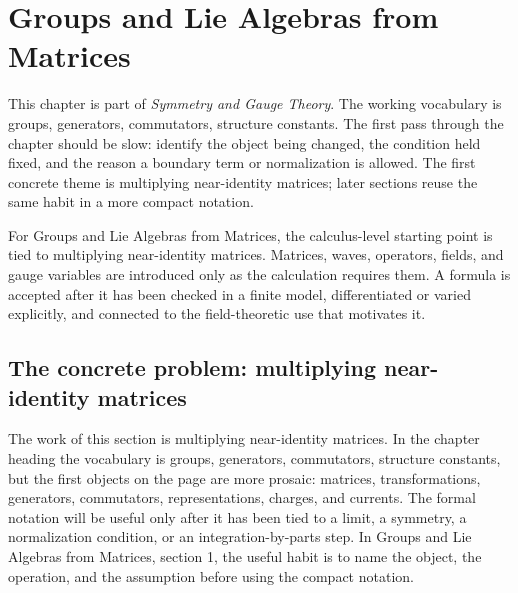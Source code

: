 \chapter{Groups and Lie Algebras from Matrices}


This chapter is part of \emph{Symmetry and Gauge Theory}.  The working vocabulary is groups, generators, commutators, structure constants.  The first pass through the chapter should be slow: identify the object being changed, the condition held fixed, and the reason a boundary term or normalization is allowed.  The first concrete theme is multiplying near-identity matrices; later sections reuse the same habit in a more compact notation.

For Groups and Lie Algebras from Matrices, the calculus-level starting point is tied to multiplying near-identity matrices.  Matrices, waves, operators, fields, and gauge variables are introduced only as the calculation requires them.  A formula is accepted after it has been checked in a finite model, differentiated or varied explicitly, and connected to the field-theoretic use that motivates it.

\section{The concrete problem: multiplying near-identity matrices}













The work of this section is multiplying near-identity matrices.  In the chapter heading the vocabulary is groups, generators, commutators, structure constants, but the first objects on the page are more prosaic: matrices, transformations, generators, commutators, representations, charges, and currents.  The formal notation will be useful only after it has been tied to a limit, a symmetry, a normalization condition, or an integration-by-parts step.  In Groups and Lie Algebras from Matrices, section 1, the useful habit is to name the object, the operation, and the assumption before using the compact notation.


